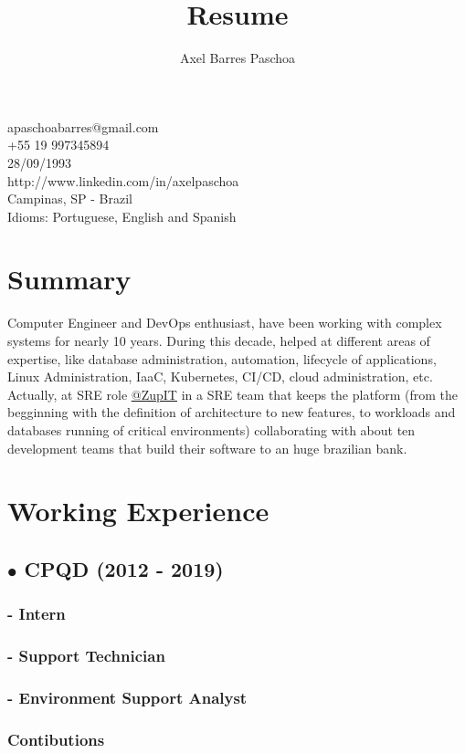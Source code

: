 \documentclass{article}
\makeatletter
\renewcommand{\maketitle}{

\begin{center}

{\huge\bfseries\theauthor}

apaschoabarres@gmail.com \\
+55 19 997345894 \\
28/09/1993 \\
http://www.linkedin.com/in/axelpaschoa \\
Campinas, SP - Brazil \\
Idioms: Portuguese, English and Spanish
\end{center}
}
\makeatother
\begin{document}
\title{Resume}
\author{Axel Barres Paschoa}

\maketitle

\section{Summary}

Computer Engineer and DevOps enthusiast, have been working with complex systems for nearly 10 years. During this decade, helped at different areas of expertise, like database administration, automation, lifecycle of applications, Linux Administration, IaaC, Kubernetes, CI/CD, cloud administration, etc. Actually, at SRE role \href{https://github.com/ZupIT}{@ZupIT} in a SRE team that keeps the platform (from the begginning with the definition of architecture to new features, to workloads and databases running of critical environments) collaborating with about ten development teams that build their software to an huge brazilian bank.


\section{Working Experience}

\subsection{$\bullet$ CPQD (2012 - 2019)}

\subsubsection{- Intern}

\subsubsection{- Support Technician}

\subsubsection{- Environment Support Analyst \\}

\subsubsection{Contibutions \\}
\end{document}
